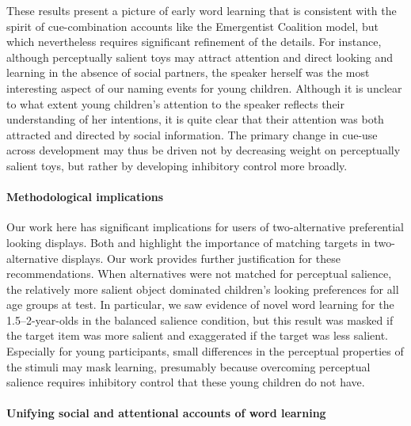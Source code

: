 \documentclass[man,floatsintext]{apa6}
\begin{document}
These results present a picture of early word learning that is consistent with the spirit of cue-combination accounts like the Emergentist Coalition model, but which nevertheless requires significant refinement of the details. For instance, although perceptually salient toys may attract attention and direct looking and learning in the absence of social partners, the speaker herself was the most interesting aspect of our naming events for young children. Although it is unclear to what extent young children's attention to the speaker reflects their understanding of her intentions, it is quite clear that their attention was both attracted and directed by social information. The primary change in cue-use across development may thus be driven not by decreasing weight on perceptually salient toys, but rather by developing inhibitory control more broadly.

\paragraph{Methodological implications}

Our work here has significant implications for users of two-alternative preferential looking displays. Both  and  highlight the importance of matching targets in two-alternative displays. Our work provides further justification for these recommendations. When alternatives were not matched for perceptual salience, the relatively more salient object dominated children's looking preferences for all age groups at test. In particular, we saw evidence of novel word learning for the 1.5--2-year-olds in the balanced salience condition, but this result was masked if the target item was more salient and exaggerated if the target was less salient. Especially for young participants, small differences in the perceptual properties of the stimuli may mask learning, presumably because overcoming perceptual salience requires inhibitory control that these young children do not have. 

\paragraph{Unifying social and attentional accounts of word learning}
\end{document}

